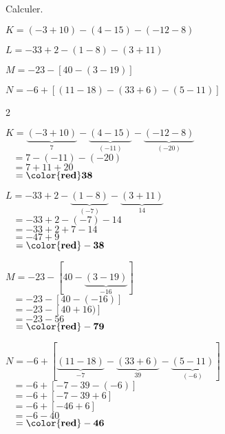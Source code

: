 \begin{exercice*}
    Calculer.
        \begin{list}{}
            \item $ K = (-3+10)-(4-15)-(-12-8)$
            \item $ L = -33+2-(1-8) -(3+11)$
            \item $ M = -23-[40-(3-19)]$
            \item $ N = -6+[(11-18)-(33+6)-(5-11)]$
        \end{list}

\end{exercice*}
\begin{corrige}
    \phantom{rrr}    
    \begin{multicols}2
        \begin{list}{}
            \item $ K=\underbrace{(-3+10)}_{7}-\underbrace{(4-15)}_{(-11)}-\underbrace{(-12-8)}_{(-20)}$\\
            $\phantom{A }=7-(-11)-(-20)$\\
            $\phantom{A }=7+11+20$\\
            $\phantom{A }=\mathbf{{\color{red}38}}$
            \item $ L=-33+2-\underbrace{(1-8)}_{(-7)} -\underbrace{(3+11)}_{14}$\\
            $\phantom{A }=-33+2-(-7)-14$\\
            $\phantom{A }=-33+2+7-14$\\
            $\phantom{A }=-47+9$\\
            $\phantom{A }=\mathbf{{\color{red}-38}}$
            \columnbreak
            \item $ M=-23-[40-\underbrace{(3-19)}_{-16}]$\\
            $\phantom{A }=-23-[40-(-16)]$\\
            $\phantom{A }=-23-[40+16)]$\\
            $\phantom{A }=-23-56$\\
            $\phantom{A }=\mathbf{{\color{red}-79}}$
            \item $ N=-6+[\underbrace{(11-18)}_{-7}-\underbrace{(33+6)}_{39}-\underbrace{(5-11)}_{(-6)}]$\\
            $\phantom{A }=-6+[-7-39-(-6)]$\\
            $\phantom{A }=-6+[-7-39+6]$\\
            $\phantom{A }=-6+[-46+6]$\\
            $\phantom{A }=-6-40$\\
            $\phantom{A }=\mathbf{{\color{red}-46}}$
        \end{list}
    \end{multicols}
\end{corrige}